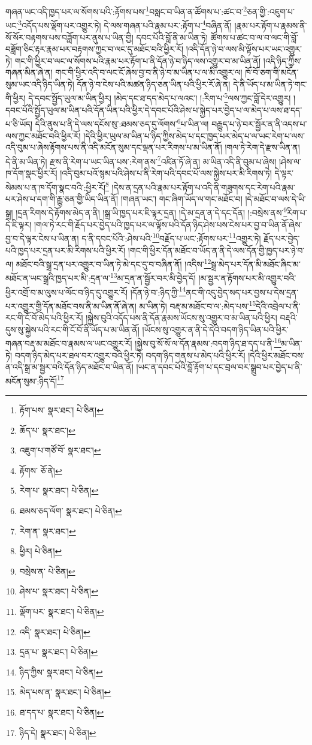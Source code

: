 གཞན་ཡང་འདི་ཁྱད་པར་ལ་སོགས་པའི་:རྟོགས་པས་\footnote{རྟོག་པས་  སྣར་ཐང་།  པེ་ཅིན། }བསླང་བ་ཡིན་ན་ཚོགས་པ་:ཚང་བ་\footnote{ཆོད་པ་  སྣར་ཐང་། }ཅན་གྱི་:འཇུག་པ་ཡང་\footnote{འཇུག་པ་གཙོ་བོ་  སྣར་ཐང་། }འདོད་པས་ལྡོག་པར་འགྱུར་ཏེ། དེ་ལས་གཞན་པའི་རྣམ་པར་:རྟོག་པ་\footnote{རྟོགས་  ཅོ་ནེ། }བཞིན་ནོ། །རྣམ་པར་རྟོག་པ་རྣམས་ནི་སོ་སོར་བརྟགས་པས་བཟློག་པར་ནུས་པ་ཡིན་གྱི། དབང་པོའི་བློ་ནི་མ་ཡིན་ཏེ། ཚོགས་པ་ཚང་བ་ལ་བ་ལང་གི་བློ་བཟློག་ཅིང་རྟར་རྣམ་པར་བརྟགས་ཀྱང་བ་ལང་དུ་མཐོང་བའི་ཕྱིར་རོ། །འདི་དོན་ཉེ་བ་ལས་མི་ལྟོས་པར་ཡང་འགྱུར་ཏེ། གང་གི་ཕྱིར་བ་ལང་ལ་སོགས་པའི་རྣམ་པར་རྟོག་པ་ནི་དོན་ཉེ་བ་ཉིད་ལས་འགྱུར་བ་མ་ཡིན་ནོ། །འདི་ཉིད་ཀྱིས་གཞན་མིན་ཞེ་ན། གང་གི་ཕྱིར་འདི་བ་ལང་ངོ་ཞེས་བྱ་བ་ནི་ཉེ་བ་མ་ཡིན་པ་ལ་མི་འགྱུར་ལ། ཁོ་བོ་ཅག་གི་མངོན་སུམ་ཡང་འདི་ཉིད་ཡིན་ཏེ། དོན་ཉེ་བ་ངེས་པའི་མཚན་ཉིད་ཅན་ཡིན་པའི་ཕྱིར་རོ་ཞེ་ན། དེ་ནི་ཡོད་པ་མ་ཡིན་ཏེ་གང་གི་ཕྱིར། དེ་དབང་སྤྱོད་ཡུལ་མ་ཡིན་ཕྱིར། །མེད་དང་ཐ་དད་མེད་པ་ལའང་། །:རིག་པ་\footnote{རེག་པ་  སྣར་ཐང་།  པེ་ཅིན། }ལས་ཀྱང་བློ་དེར་འགྱུར། །དབང་པོའི་སྤྱོད་ཡུལ་མ་ཡིན་པའི་དོན་ཡིན་པའི་ཕྱིར་དེ་དབང་པོའི་ཤེས་པ་སྐྱེད་པར་བྱེད་པ་ལ་མེད་པ་ལས་ཐ་དད་པ་ཅི་ཡོད། དེའི་ནུས་པ་ནི་དེ་ལས་དངོས་སུ་:ཐམས་ཅད་དུ་ལོགས་\footnote{ཐམས་ཅད་ལོག་  སྣར་ཐང་།  པེ་ཅིན། }པ་ཡིན་ལ། བརྒྱུད་པ་ཉེ་བར་སྦྱོར་ན་ནི་འདས་པ་ལས་ཀྱང་མཐོང་བའི་ཕྱིར་རོ། །དེའི་ཕྱིར་ཡུལ་མ་ཡིན་པ་ཉིད་ཀྱིས་མེད་པ་དང་ཁྱད་པར་མེད་པ་ལ་ཡང་རེག་པ་ལས་འདི་བུམ་པ་ཞེས་རྟོགས་པས་ནི་འདི་མངོན་སུམ་དང་ལྡན་པར་རིགས་པ་མ་ཡིན་ནོ། །གལ་ཏེ་རེག་དེ་རྫས་ཡིན་ན། དེ་ནི་མ་ཡིན་ཏེ། རྫས་ནི་རེག་པ་ཡང་ཡིན་པས་:རེག་ནས་\footnote{རེག་ན་  སྣར་ཐང་། }འཛིན་ཏོ་ཞེ་ན། མ་ཡིན་འདི་ནི་བུམ་པ་ཞེས། །ཤེས་ལ་ཁ་དོག་སྣང་ཕྱིར་རོ། །འདི་བུམ་པའོ་སྙམ་པའི་ཤེས་པ་ནི་རེག་པའི་དབང་པོ་ལས་སྐྱེས་པར་མི་རིགས་ཏེ། དེ་ལྟར་སེམས་པ་ན་ཁ་དོག་སྣང་བའི་:ཕྱིར་རོ།\footnote{ཕྱིར།  པེ་ཅིན། } །དེས་ན་དྲན་པའི་རྣམ་པར་རྟོག་པ་འདི་ནི་གཟུགས་དང་རེག་པའི་རྣམ་པར་ཤེས་པ་དག་གི་རྒྱུ་ཅན་གྱི་ཡིད་ཡིན་ནོ། །གཞན་ཡང་། གང་ཞིག་ཡོད་ལ་གང་མཐོང་བ། །དེ་མཐོང་བ་ལས་དེ་ཡི་སྒྲ། །དྲན་རིགས་དེ་རྟོགས་མེད་ན་ནི། །སྒྲ་ཡི་ཁྱད་པར་ཇི་ལྟར་དྲན། །དེ་མ་དྲན་ན་དེ་དང་དོན། །:བསྲེས་ནས་\footnote{བསྲེས་ན་  པེ་ཅིན། }རིག་པ་དེ་ཇི་ལྟར། །གལ་ཏེ་རང་གི་རྗོད་པར་བྱེད་པའི་ཁྱད་པར་ལ་ལྟོས་པའི་དོན་ཉིད་ཤེས་པས་ངེས་པར་བྱ་བ་ཡིན་ནོ་ཞེས་བྱ་བ་དེ་ལྟར་ངེས་པ་ཡིན་ན། ད་ནི་དབང་པོའི་:ཤེས་པའི་\footnote{ཤེས་པ་  སྣར་ཐང་།  པེ་ཅིན། }བརྗོད་པ་ཡང་:རྟོགས་པར་\footnote{ལྡོག་པར་  སྣར་ཐང་།  པེ་ཅིན། }འགྱུར་ཏེ། རྗོད་པར་བྱེད་པའི་ཁྱད་པར་དྲན་པར་མི་རིགས་པའི་ཕྱིར་རོ། །གང་གི་ཕྱིར་དོན་མཐོང་བ་ཡོད་ན་ནི་དེ་ལས་དོན་གྱི་ཁྱད་པར་ཉེ་བ་ལ། མཐོང་བའི་སྒྲ་དྲན་པར་འགྱུར་བ་ཡིན་ཏེ་མེ་དང་དུ་བ་བཞིན་ནོ། །འདིས་\footnote{འདི་  སྣར་ཐང་།  པེ་ཅིན། }སྒྲ་མེད་པར་དོན་མི་མཐོང་ཞིང་མ་མཐོང་ན་ཡང་སྒྲའི་ཁྱད་པར་མི་:དྲན་ལ་\footnote{དྲན་པ་  སྣར་ཐང་།  པེ་ཅིན། }མ་དྲན་ན་སྦྱོར་བར་མི་བྱེད་དོ། །མ་སྦྱར་ན་རྟོགས་པར་མི་འགྱུར་བའི་ཕྱིར་འགྲོ་བ་མ་ལུས་པ་ལོང་བ་ཉིད་དུ་འགྱུར་རོ། །དོན་ཉེ་བ་:ཉིད་ཀྱི་\footnote{ཉིད་ཀྱིས་  སྣར་ཐང་།  པེ་ཅིན། }ནང་གི་འདུ་བྱེད་སད་པར་བྱས་པ་དེས་དྲན་པར་འགྱུར་གྱི་དོན་མཐོང་བས་ནི་མ་ཡིན་ནོ་ཞེ་ན། མ་ཡིན་ཏེ། བརྡ་མ་མཐོང་བ་ལ་:མེད་པས་\footnote{མེད་པས་ན་  སྣར་ཐང་།  པེ་ཅིན། }དེའི་འབྲེལ་པ་ནི་རང་གི་ངོ་བོ་མེད་པའི་ཕྱིར་རོ། །སྐྱེས་བུའི་འདོད་པས་ནི་དོན་རྣམས་ཡོངས་སུ་འགྱུར་བ་མ་ཡིན་པའི་ཕྱིར། བརྡའི་དུས་སུ་སྐྱེས་པའི་རང་གི་ངོ་བོ་ནི་ཡོད་པ་མ་ཡིན་ནོ། །ཡོངས་སུ་འགྱུར་ན་ནི་དེ་དེའི་བདག་ཉིད་ཡིན་པའི་ཕྱིར་གཞན་བརྡ་མ་མཐོང་བ་རྣམས་ལ་ཡང་འགྱུར་རོ། །སྐྱེས་བུ་སོ་སོ་ལ་དོན་རྣམས་:བདག་ཉིད་ཐ་དད་པ་ནི་\footnote{ཐ་དད་པ་  སྣར་ཐང་།  པེ་ཅིན། }མ་ཡིན་ཏེ། བདག་ཉིད་མེད་པར་ཐལ་བར་འགྱུར་བའི་ཕྱིར་ཏེ། བདག་ཉིད་གནས་པ་མེད་པའི་ཕྱིར་རོ། །དེའི་ཕྱིར་མཐོང་བས་ན་འདི་སྒྲ་མ་སྦྱར་བའི་དོན་ཉིད་མཐོང་བ་ཡིན་ནོ། །ཡང་ན་དབང་པོའི་བློ་རྟོག་པ་དང་བྲལ་བར་སྒྲུབ་པར་བྱེད་པ་ནི་མངོན་སུམ་:ཉིད་དོ།\footnote{ཉིད་དེ།  སྣར་ཐང་།  པེ་ཅིན། } 
